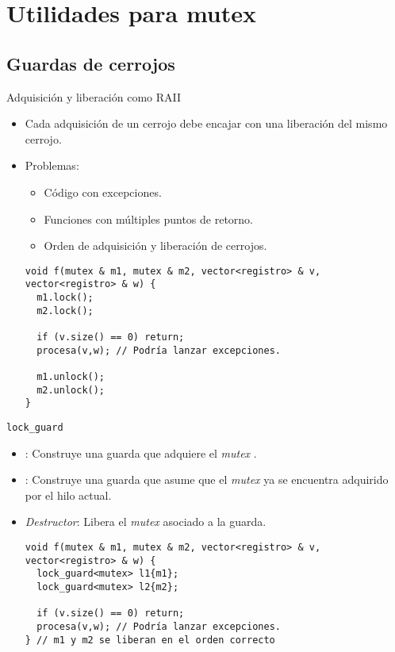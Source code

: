 \section{Utilidades para mutex}

\subsection{Guardas de cerrojos}

\begin{frame}[fragile]{Adquisición y liberación como RAII}
\begin{itemize}
  \item Cada adquisición de un cerrojo debe encajar con una liberación del mismo cerrojo.
  \item Problemas:
    \begin{itemize}
      \item Código con excepciones.
      \item Funciones con múltiples puntos de retorno.
      \item Orden de adquisición y liberación de cerrojos.
    \end{itemize}
\begin{lstlisting}
void f(mutex & m1, mutex & m2, vector<registro> & v, vector<registro> & w) {
  m1.lock();
  m2.lock();
  
  if (v.size() == 0) return;
  procesa(v,w); // Podría lanzar excepciones.
 
  m1.unlock();
  m2.unlock();
}
\end{lstlisting}
\end{itemize}
\end{frame}

\begin{frame}[fragile]{\texttt{lock\_guard}}
\begin{itemize}
  \item {}: Construye una guarda que adquiere el \emph{mutex} .
  \item {}: Construye una guarda que asume que el \emph{mutex}  ya
        se encuentra adquirido por el hilo actual.
  \item \emph{Destructor}: Libera el \emph{mutex} asociado a la guarda.
\begin{lstlisting}
void f(mutex & m1, mutex & m2, vector<registro> & v, vector<registro> & w) {
  lock_guard<mutex> l1{m1};
  lock_guard<mutex> l2{m2};
  
  if (v.size() == 0) return;
  procesa(v,w); // Podría lanzar excepciones.
} // m1 y m2 se liberan en el orden correcto
\end{lstlisting}
\end{itemize}
\end{frame}


